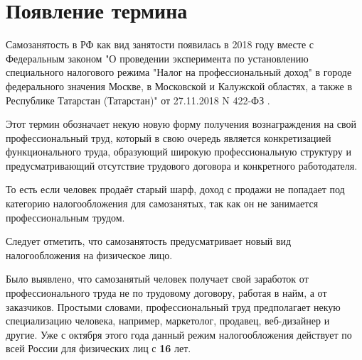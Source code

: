 \section{Появление термина}

Самозанятость в РФ как вид занятости появилась в 2018 году вместе с Федеральным законом "О проведении эксперимента по установлению специального налогового режима "Налог на профессиональный доход" в городе федерального значения Москве, в Московской и Калужской областях, а также в Республике Татарстан (Татарстан)" от 27.11.2018 N 422-ФЗ \cite{law-self-emp}.

Этот термин обозначает некую новую форму получения вознаграждения на свой профессиональный труд,
который в свою очередь является конкретизацией функционального труда,
образующий широкую профессиональную структуру и предусматривающий 
отсутствие трудового договора и конкретного работодателя.

То есть если человек продаёт старый шарф, 
доход с продажи не попадает под категорию налогообложения для самозанятых,
так как он не занимается профессиональным трудом.

Следует отметить, 
что самозанятость предусматривает новый вид налогообложения на физическое лицо.

Было выявлено, что самозанятый человек получает свой заработок от профессионального труда не по трудовому договору, работая в найм, а от заказчиков. Простыми словами, профессиональный труд предполагает некую специализацию человека, например, маркетолог, продавец, веб-дизайнер и другие. Уже с октября этого года данный режим налогообложения действует по всей России для физических лиц с \textbf{16} лет.